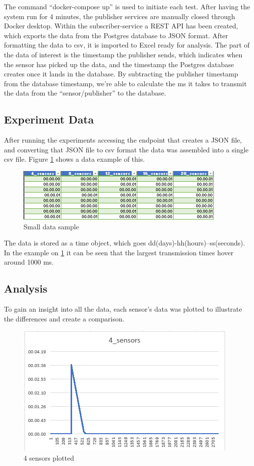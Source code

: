 The command “docker-compose up” is used to initiate each test.
After having the system run for 4 minutes, the publisher services are manually closed through Docker desktop.
Within the subscriber-service a REST API has been created, which exports the data from the Postgres database to JSON format.
After formatting the data to csv, it is imported to Excel ready for analysis.
The part of the data of interest is the timestamp the publisher sends, which indicates when the sensor has picked up the data, and the timestamp the Postgres database creates once it lands in the database. By subtracting the publisher timestamp from the database timestamp, we’re able to calculate the ms it takes to transmit the data from the “sensor/publisher” to the database.


\newpage
\subsection{Experiment Data}
\label{sec:experiment_data}
After running the experiments accessing the endpoint that creates a JSON file, and converting that JSON file to csv format the data was assembled into a single csv file. Figure \ref{figure:4} shows a data example of this.
\begin{figure}[!ht]
    \centering
    \includegraphics[scale=0.8]{Images/Data_sample.png}
    \caption{Small data sample}
    \label{figure:4}
\end{figure}

The data is stored as a time object, which goes dd(days)-hh(hours)--ss(seconds). In the example on \ref{figure:4} it can be seen that the largest transmission times hover around 1000 ms.



\subsection{Analysis}
\label{sec:analysis}
To gain an insight into all the data, each sensor's data was plotted to illustrate the differences and create a comparison.

\begin{figure}[!ht]
    \centering
    \includegraphics[scale=0.8]{Images/4sensors.png}
    \caption{4 sensors plotted}
    \label{figure:5}
\end{figure}

